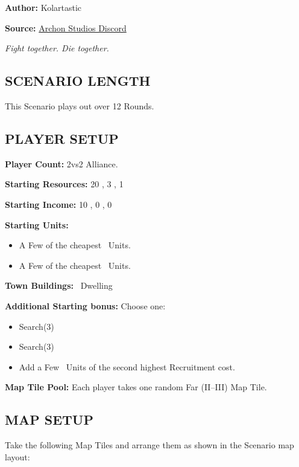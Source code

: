 
\begin{multicols*}{2}

\textbf{Author:} Kolartastic

\textbf{Source:} \href{https://discord.com/channels/740870068178649108/1161571991732625468/threads/1164804609605390386}{Archon Studios Discord}

\textit{Fight together. Die together.}  %

\subsection*{\MakeUppercase{Scenario Length}}
This Scenario plays out over 12 Rounds.

\subsection*{\MakeUppercase{Player Setup}}
\textbf{Player Count:} 2vs2 Alliance.

\textbf{Starting Resources:} 20 , 3 , 1 

\textbf{Starting Income:} 10 , 0 , 0 

\textbf{Starting Units:}

\begin{itemize}
  \item A Few of the cheapest \bronze\ Units.
  \item A Few of the cheapest \silver\ Units.
\end{itemize}

\textbf{Town Buildings:} \bronze\ Dwelling

\textbf{Additional Starting bonus:}
Choose one:
\begin{itemize}
  \item Search(3) 
  \item Search(3) 
  \item Add a Few \bronze\ Units of the second highest Recruitment cost.
\end{itemize}

\textbf{Map Tile Pool:} Each player takes one random Far (II–III) Map Tile.

\subsection*{\MakeUppercase{Map Setup}}
Take the following Map Tiles and arrange them as shown in the Scenario map layout:


\end{multicols*}
